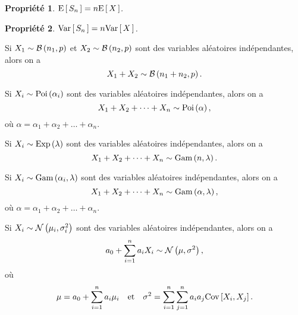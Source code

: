\documentclass[11pt]{article}
\newcommand\Bin[2]{%
	\ensuremath{%
		\mathcal{B}\left(#1,#2\right)%
	}%
}%
\newcommand\Poi[1]{%
	\ensuremath{%
		\mathrm{Poi}\left(#1\right)%
	}%
}%
\newcommand\Exp[1]{%
	\ensuremath{%
		\mathrm{Exp}\left(#1\right)%
	}%
}%
\newcommand\Gam[2]{%
	\ensuremath{%
		\mathrm{Gam}\left(#1,#2\right)%
	}%
}%
\newcommand\Norm[2]{%
	\ensuremath{%
		\mathcal{N}\left(#1,#2\right)%
	}%
}%
\newcommand\Esp[1]{%
	\ensuremath{%
		\mathrm{E}\left[\,#1\,\right]%
	}%
}%
\newcommand\Var[1]{%
	\ensuremath{%
		\mathrm{Var}\left[\,#1\,\right]%
	}%
}%
\newcommand\Cov[2]{%
	\ensuremath{%
		\mathrm{Cov}\left[#1,#2\right]%
	}%
}%
\newtheorem{property}{Propriété}
\theoremstyle{remark}
\theoremstyle{definition}
\begin{document}
\begin{property}
	$\Esp{S_n}=n\Esp{X}$.
\end{property}

\begin{property}
	$\Var{S_n}=n\Var{X}$.
\end{property}

\begin{exemple}
	Si $X_1\sim\Bin{n_1}{p}$ et $X_2\sim\Bin{n_2}{p}$ sont des variables
	aléatoires indépendantes, alors on a
	\begin{equation*}
		X_1+X_2\sim\Bin{n_1+n_2}{p}.
	\end{equation*}
\end{exemple}

\begin{exemple}
	Si $X_i\sim\Poi{\alpha_i}$ sont des variables aléatoires indépendantes,
	alors on a
	\begin{equation*}
		X_1+X_2+\dots+X_n\sim\Poi{\alpha},
	\end{equation*}
	où $\alpha=\alpha_1+\alpha_2+\dots+\alpha_n$.
\end{exemple}

\begin{exemple}
	Si $X_i\sim\Exp{\lambda}$ sont des variables aléatoires indépendantes,
	alors on a
	\begin{equation*}
		X_1+X_2+\dots+X_n\sim\Gam{n}{\lambda}.
	\end{equation*}
\end{exemple}

\begin{exemple}
	Si $X_i\sim\Gam{\alpha_i}{\lambda}$ sont des variables aléatoires
	indépendantes, alors on a
	\begin{equation*}
		X_1+X_2+\dots+X_n\sim\Gam{\alpha}{\lambda},
	\end{equation*}
	où $\alpha=\alpha_1+\alpha_2+\dots+\alpha_n$.
\end{exemple}

\begin{exemple}
	Si $X_i\sim\Norm{\mu_i}{\sigma_i^2}$ sont des variables aléatoires
	indépendantes, alors on a
	\begin{equation*}
		a_0+\sum_{i=1}^na_iX_i\sim\Norm{\mu}{\sigma^2},
	\end{equation*}
	où
	\begin{equation*}
		\mu=a_0+\sum_{i=1}^na_i\mu_i
		\quad\text{et}\quad
		\sigma^2=\sum_{i=1}^n\sum_{j=1}^na_ia_j\Cov{X_i}{X_j}.
	\end{equation*}
\end{exemple}
\end{document}
